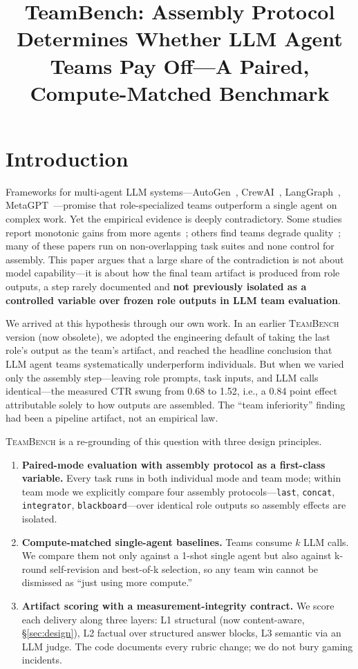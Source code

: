 \documentclass[sigconf,anonymous]{aamas}
\title[TeamBench: Assembly Protocol Determines Whether LLM Agent Teams Pay Off]{TeamBench: Assembly Protocol Determines Whether LLM Agent Teams Pay Off---A Paired, Compute-Matched Benchmark}
\newcommand{\teambench}{\textsc{TeamBench}}
\newcommand{\code}[1]{\texttt{#1}}
\begin{document}
\maketitle

\section{Introduction}
\label{sec:intro}

Frameworks for multi-agent LLM systems---AutoGen~\citep{wu2023autogen}, CrewAI~\citep{crewai2024}, LangGraph~\citep{langgraph2024}, MetaGPT~\citep{hong2024metagpt}---promise that role-specialized teams outperform a single agent on complex work. Yet the empirical evidence is deeply contradictory. Some studies report monotonic gains from more agents~\citep{li2024moreagents}; others find teams degrade quality~\citep{cemri2025masfail}; many of these papers run on non-overlapping task suites and none control for assembly. This paper argues that a large share of the contradiction is not about model capability---it is about how the final team artifact is produced from role outputs, a step rarely documented and \textbf{not previously isolated as a controlled variable over frozen role outputs in LLM team evaluation}.

We arrived at this hypothesis through our own work. In an earlier \teambench{} version (now obsolete), we adopted the engineering default of taking the last role's output as the team's artifact, and reached the headline conclusion that LLM agent teams systematically underperform individuals. But when we varied only the assembly step---leaving role prompts, task inputs, and LLM calls identical---the measured CTR swung from 0.68 to 1.52, i.e., a 0.84 point effect attributable solely to how outputs are assembled. The ``team inferiority'' finding had been a pipeline artifact, not an empirical law.

\teambench{} is a re-grounding of this question with three design principles.

\begin{enumerate}
\item \textbf{Paired-mode evaluation with assembly protocol as a first-class variable.} Every task runs in both individual mode and team mode; within team mode we explicitly compare four assembly protocols---\code{last}, \code{concat}, \code{integrator}, \code{blackboard}---over identical role outputs so assembly effects are isolated.
\item \textbf{Compute-matched single-agent baselines.} Teams consume $k$ LLM calls. We compare them not only against a 1-shot single agent but also against k-round self-revision and best-of-k selection, so any team win cannot be dismissed as ``just using more compute.''
\item \textbf{Artifact scoring with a measurement-integrity contract.} We score each delivery along three layers: L1 structural (now content-aware, \S\ref{sec:design}), L2 factual over structured answer blocks, L3 semantic via an LLM judge. The code documents every rubric change; we do not bury gaming incidents.
\end{enumerate}
\end{document}
